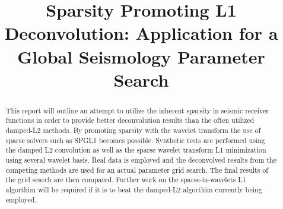 \documentclass[jgrga]{agutex}
\begin{document}
%
%


\title{Sparsity Promoting L1 Deconvolution: Application for a Global Seismology Parameter Search}
%
%

%
%










%
%


\begin{abstract}
This report will outline an attempt to utilize the inherent sparsity in seismic receiver functions in order to provide better deconvolution results than the often utilized damped-L2 methods. By promoting sparsity with the wavelet transform the use of sparse solvers such as SPGL1 becomes possible. Synthetic tests are performed using the damped L2 convolution as well as the sparse wavelet transform L1 minimization using several wavelet basis. Real data is employed and the deconvolved results from the competing methods are used for an actual parameter grid search. The final results of the grid search are then compared. Further work on the sparse-in-wavelets L1 algorthim will be required if it is to beat the damped-L2 algorthim currently being employed.
\end{abstract}
%
%
\end{document}
